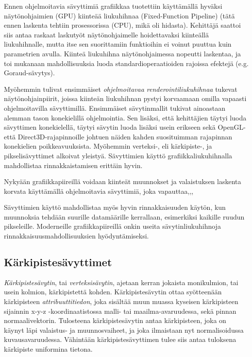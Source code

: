 \documentclass[finnish]{tktltiki2}
\theoremstyle{definition}
\theoremstyle{remark}
\begin{document}
Ennen ohjelmoitavia sävyttimiä grafiikkaa tuotettiin käyttämällä hyväksi näytönohjaimien (GPU) kiinteää liukuhihnaa (Fixed-Function Pipeline) (tätä ennen laskenta tehtiin prosessorissa (CPU), mikä oli hidasta). Kehittäjä saattoi siis antaa raskaat laskutyöt näytönohjaimelle hoidettavaksi kiinteällä liukuhihnalle, mutta itse sen suorittamiin funktioihin ei voinut puuttua kuin parametrien avulla. Kiinteä liukuhihna näytönohjaimessa nopeutti laskentaa, ja toi mukanaan mahdollisuuksia luoda standardioperaatioiden rajoissa efektejä (e.g. Goraud-sävytys).

Myöhemmin tulivat ensimmäiset \emph{ohjelmoitavaa renderointiliukuhihnaa} tukevat näytönohjainpiirit, joissa kiinteän liukuhihnan pystyi korvaamaan omilla vapaasti ohjelmoitavilla sävyttimillä. Ensimmäiset sävytinmallit tukivat ainoastaan alemman tason konekielillä ohjelmointia. Sen lisäksi, että kehittäjien täytyi luoda sävyttimen konekielellä, täytyi sävytin luoda lisäksi usein erikseen sekä OpenGL- että Direct3D-rajapinnoille johtuen näiden kahden suosituimman rajapinnan konekielien poikkeavuuksista. Myöhemmin verteksi-, eli kärkipiste-, ja pikselisävyttimet alkoivat yleistyä. Sävyttimien käyttö grafiikkaliukuhihnalla mahdollistaa rinnakkaistamisen erittäin hyvin. 
\cite{Ake02}

Nykyään grafiikkapiireillä voidaan kiinteät muunnokset ja valaistuksen laskenta korvata käyttämällä ohjelmoitavia sävyttimiä, joka vapauttaa,,,

Sävyttimien käyttö mahdollistaa myös hyvin rinnakkaisuuden käytön, kun muunnoksia tehdään suurille datamäärille kerrallaan, esimerkiksi kaikille ruudun pikseleille. Moderneille grafiikkapiireillä onkin useita sävytinliukuhihnoja rinnakkaisuusmahdollisuuksien hyödyntämiseksi.

\subsection{Kärkipistesävyttimet}

\emph{Kärkipistesävytin}, tai \emph{verteksisävytin}, ajetaan kerran jokaista monikulmion, tai usein kolmion, kärkipistettä kohden. Kärkipistesävytin ottaa syötteenään kärkipisteen \emph{attribuuttitiedon}, joka sisältää muun muassa kyseisen kärkipisteen sijainnin x-y-z -koordinaatistossa malli- tai maailma-avaruudessa, sekä pinnan normaalivektorin. Tulosteena kärkipistesävytin antaa kärkipisteen, joka on käynyt läpi valaistus- ja muunnosvaiheet, ja joka ilmaistaan nyt normalisoidussa kuvausavaruudessa. Vähintään kärkipistesävyttimen tulee siis antaa tuloksena kärkipiste uniformina tietona. \cite{Puh08}
\end{document}
